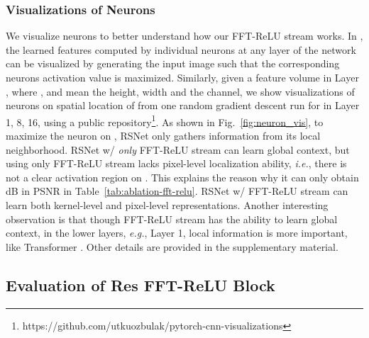 \documentclass[letterpaper]{article} \usepackage{aaai23}  \usepackage{times}  \usepackage{helvet}  \usepackage{courier}  \usepackage[hyphens]{url}  \usepackage{graphicx} \usepackage{enumitem}
\begin{document}
\subsubsection{Visualizations of Neurons}
We visualize neurons to better understand how our FFT-ReLU stream works. In \cite{Yosinski2015understanding}, the learned features computed by individual neurons at any layer of the network can be visualized by generating the input image such that the corresponding neurons activation value is maximized. Similarly, given a feature volume  in Layer , where ,  and  mean the height, width and the channel, we show visualizations of neurons on spatial location of  from one random gradient descent run for  in Layer 1, 8, 16, using a public repository\footnote{https://github.com/utkuozbulak/pytorch-cnn-visualizations}. As shown in Fig.~\ref{fig:neuron_vis}, to maximize the neuron on , RSNet only gathers information from its local neighborhood. RSNet w/ \textit{only} FFT-ReLU stream can learn global context, but using only FFT-ReLU stream lacks pixel-level localization ability, \textit{i.e.}, there is not a clear activation region on . This explains the reason why it can only obtain  dB in PSNR in Table~\ref{tab:ablation-fft-relu}.  RSNet w/ FFT-ReLU stream can learn both kernel-level and pixel-level representations. Another interesting observation is that though FFT-ReLU stream has the ability to learn global context, in the lower layers, \textit{e.g.}, Layer 1, local information is more important, like Transformer \cite{Raghu2021do}. Other details are provided in the supplementary material.

\subsection{{Evaluation of Res FFT-ReLU Block}}
\end{document}

